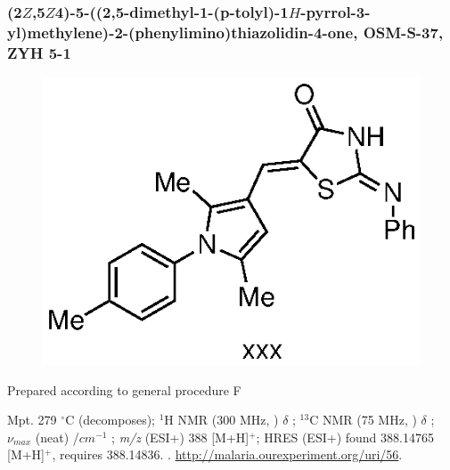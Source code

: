 \documentclass[12pt, a4paper,titlepage]{article}
\begin{document}
{\subsubsection*{(2$Z$,5$Z$4)-5-((2,5-dimethyl-1-(p-tolyl)-1$H$-pyrrol-3-yl)methylene)-2-(phenylimino)thiazolidin-4-one, OSM-S-37, ZYH 5-1}
\label{exp:ZYH5}
	\begin{figure}[H]
	\begin{center}
	\includegraphics{exp/ZYH5.eps}
	\end{center}
	\vspace{-25pt}	
	\end{figure}

Prepared according to general procedure F

Mpt. 279 $^\circ$C (decomposes); 
$^1$H NMR (300 MHz, ) $\delta$ ; 
  $^{13}$C NMR (75 MHz, ) $\delta$ ; 
 $\nu_{max}$ (neat) /$cm^{-1}$ ; 
\emph{m/z} (ESI+) 388 [M+H]$^+$; HRES (ESI+) found 388.14765 [M+H]$^+$,  requires 388.14836.
. 
\url{http://malaria.ourexperiment.org/uri/56}. 

}
\end{document}
